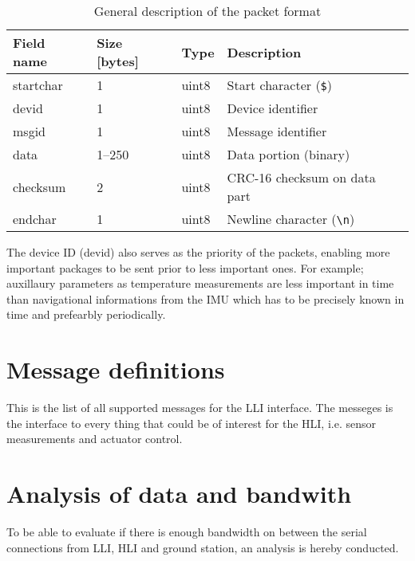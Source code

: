 \begin{table}[htbp]
	\centering
	\begin{tabular}{llll}
		\toprule
		\textbf{Field name} & \textbf{Size [bytes]} & \textbf{Type} & \textbf{Description}\\
		\midrule
		startchar & 1 & uint8 & Start character (\texttt{\$}) \\
		devid & 1 & uint8 & Device identifier \\
		msgid & 1 & uint8 & Message identifier \\
		data & 1--250 & uint8 & Data portion (binary)\\
		checksum & 2 & uint8 & CRC-16 checksum on data part \\
		endchar & 1 & uint8 & Newline character (\texttt{\textbackslash n})\\
		\bottomrule
	\end{tabular}
	\caption{General description of the packet format}
	\label{tab:general}
\end{table}

The device ID (devid) also serves as the priority of the packets, enabling more important packages to be sent prior to less important ones. For example; auxillaury parameters as temperature measurements are less important in time than navigational informations from the \ac{IMU} which has to be precisely known in time and prefearbly periodically.

\section{Message definitions}
This is the list of all supported messages for the LLI interface. The messeges is the interface to every thing that could be of interest for the HLI, i.e. sensor measurements and actuator control.

\section{Analysis of data and bandwith}
\label{sec:lli-bandwith}
To be able to evaluate if there is enough bandwidth on between the serial connections from LLI, HLI and ground station, an analysis is hereby conducted.

